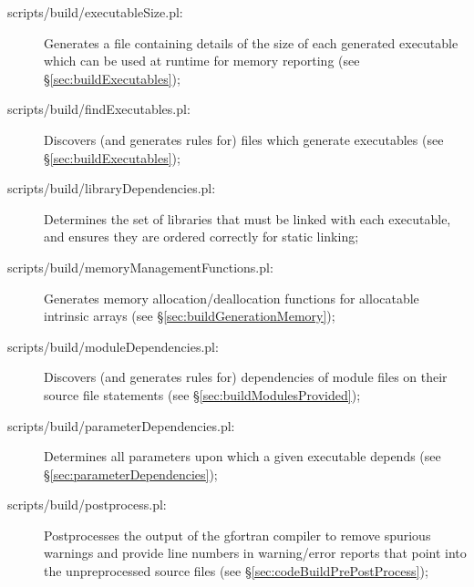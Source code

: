\begin{description}
\item[{\normalfont \ttfamily \normalfont \ttfamily scripts/build/executableSize.pl}:] Generates a file containing details of the size of each generated executable which can be used at runtime for memory reporting (see \S\ref{sec:buildExecutables});

\item[{\normalfont \ttfamily \normalfont \ttfamily scripts/build/findExecutables.pl}:] Discovers (and generates rules for) files which generate executables (see \S\ref{sec:buildExecutables});

\item[{\normalfont \ttfamily scripts/build/libraryDependencies.pl}:] Determines the set of libraries that must be linked with each executable, and ensures they are ordered correctly for static linking;

\item[{\normalfont \ttfamily scripts/build/memoryManagementFunctions.pl}:] Generates memory allocation/deallocation functions for allocatable intrinsic arrays (see \S\ref{sec:buildGenerationMemory});

\item[{\normalfont \ttfamily scripts/build/moduleDependencies.pl}:] Discovers (and generates rules for) dependencies of module files on their source file statements (see \S\ref{sec:buildModulesProvided});

\item[{\normalfont \ttfamily scripts/build/parameterDependencies.pl}:] Determines all parameters upon which a given executable depends (see \S\ref{sec:parameterDependencies});

\item[{\normalfont \ttfamily scripts/build/postprocess.pl}:] Postprocesses the output of the {\normalfont \ttfamily gfortran} compiler to remove spurious warnings and provide line numbers in warning/error reports that point into the unpreprocessed source files (see \S\ref{sec:codeBuildPrePostProcess});


\end{description}
